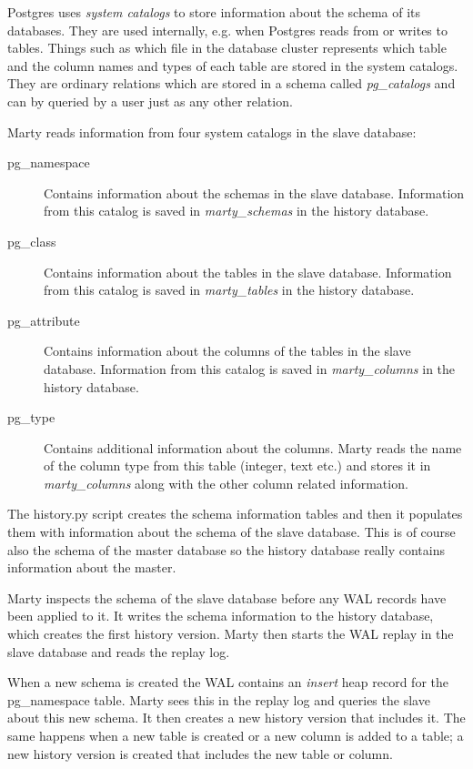 Postgres uses \textit{system catalogs} to store information about the schema of its databases.
They are used internally, e.g. when Postgres reads from or writes to tables.
Things such as which file in the database cluster represents which table and the column names and types of each table are stored in the system catalogs. %
They are ordinary relations which are stored in a schema called \textit{pg\_catalogs} and can by queried by a user just as any other relation.

Marty reads information from four system catalogs in the slave database:

\begin{description}
  \item[pg\_namespace]
    Contains information about the schemas in the slave database.
    Information from this catalog is saved in \textit{marty\_schemas} in the history database. %
  \item[pg\_class]
    Contains information about the tables in the slave database.
    Information from this catalog is saved in \textit{marty\_tables} in the history database.
  \item[pg\_attribute]
    Contains information about the columns of the tables in the slave database.
    Information from this catalog is saved in \textit{marty\_columns} in the history database.
  \item[pg\_type]
    Contains additional information about the columns.
    Marty reads the name of the column type from this table (integer, text etc.) and stores it in \textit{marty\_columns} along with the other column related information.
\end{description}

The history.py script creates the schema information tables and then it populates them with information about the schema of the slave database.
This is of course also the schema of the master database so the history database really contains information about the master.

Marty inspects the schema of the slave database before any WAL records have been applied to it.
It writes the schema information to the history database, which creates the first history version.
Marty then starts the WAL replay in the slave database and reads the replay log.

When a new schema is created the WAL contains an \textit{insert} heap record for the pg\_namespace table.
Marty sees this in the replay log and queries the slave about this new schema.
It then creates a new history version that includes it.
The same happens when a new table is created or a new column is added to a table; a new history version is created that includes the new table or column.

